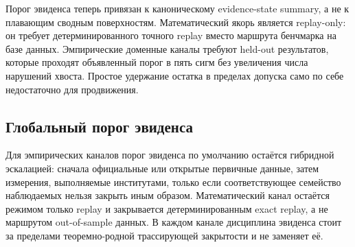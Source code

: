 Порог эвиденса теперь привязан к каноническому evidence-state summary, а не к плавающим сводным поверхностям. Математический якорь является replay-only: он требует детерминированного точного replay вместо маршрута бенчмарка на базе данных. Эмпирические доменные каналы требуют held-out результатов, которые проходят объявленный порог в пять сигм без увеличения числа нарушений хвоста. Простое удержание остатка в пределах допуска само по себе недостаточно для продвижения.

\subsection{Глобальный порог эвиденса}
Для эмпирических каналов порог эвиденса по умолчанию остаётся гибридной эскалацией: сначала официальные или открытые первичные данные, затем измерения, выполняемые институтами, только если соответствующее семейство наблюдаемых нельзя закрыть иным образом. Математический канал остаётся режимом только replay и закрывается детерминированным exact replay, а не маршрутом out-of-sample данных. В каждом канале дисциплина эвиденса стоит за пределами теоремно-родной трассирующей закрытости и не заменяет её.

